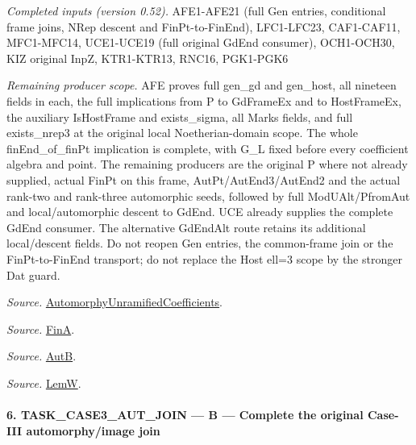 \documentclass[11pt,a4paper]{article}
\numberwithin{equation}{section}
\theoremstyle{remark}\newtheorem{remark}[theorem]{Remark}
\begin{document}
\emph{Completed inputs (version 0.52).} AFE1-AFE21 (full Gen entries, conditional frame joins, NRep descent and FinPt-to-FinEnd), LFC1-LFC23, CAF1-CAF11, MFC1-MFC14, UCE1-UCE19 (full original GdEnd consumer), OCH1-OCH30, KIZ original InpZ, KTR1-KTR13, RNC16, PGK1-PGK6

\emph{Remaining producer scope.} AFE proves full gen\_\allowbreak gd and gen\_\allowbreak host, all nineteen fields in each, the full implications from P to GdFrameEx and to HostFrameEx, the auxiliary IsHostFrame and exists\_\allowbreak sigma, all Marks fields, and full exists\_\allowbreak nrep3 at the original local Noetherian-domain scope. The whole finEnd\_\allowbreak of\_\allowbreak finPt implication is complete, with G\_\allowbreak L fixed before every coefficient algebra and point. The remaining producers are the original P where not already supplied, actual FinPt on this frame, AutPt/AutEnd3/AutEnd2 and the actual rank-two and rank-three automorphic seeds, followed by full ModUAlt/PfromAut and local/automorphic descent to GdEnd. UCE already supplies the complete GdEnd consumer. The alternative GdEndAlt route retains its additional local/descent fields. Do not reopen Gen entries, the common-frame join or the FinPt-to-FinEnd transport; do not replace the Host ell=3 scope by the stronger Dat guard.

\emph{Source.} \href{https://github.com/CocoSgt/riemann-hypothesis-lean/blob/7cbf7a0c32fca1badf05931879a37c3f8a2b03b4/src/Development/AutomorphicArithmetic/AutomorphicVarieties/AutomorphicCases/AutomorphyUnramifiedCoefficients.lean#L24-L27}{AutomorphyUnramifiedCoefficients}.

\emph{Source.} \href{https://github.com/CocoSgt/riemann-hypothesis-lean/blob/7cbf7a0c32fca1badf05931879a37c3f8a2b03b4/src/Development/AutomorphicArithmetic/AutomorphicVarieties/AutomorphicCases/AutomorphyUnramifiedCoefficients.lean#L12-L13}{FinA}.

\emph{Source.} \href{https://github.com/CocoSgt/riemann-hypothesis-lean/blob/7cbf7a0c32fca1badf05931879a37c3f8a2b03b4/src/Development/AutomorphicArithmetic/AutomorphicVarieties/AutomorphicCases/AutomorphyUnramifiedCoefficients.lean#L15-L17}{AutB}.

\emph{Source.} \href{https://github.com/CocoSgt/riemann-hypothesis-lean/blob/7cbf7a0c32fca1badf05931879a37c3f8a2b03b4/src/Development/AutomorphicArithmetic/AutomorphicVarieties/AutomorphicCases/AutomorphyUnramifiedCoefficients.lean#L19-L22}{LemW}.



\paragraph{6. TASK\_\allowbreak CASE3\_\allowbreak AUT\_\allowbreak JOIN — B — Complete the original Case-III automorphy/image join}
\end{document}

